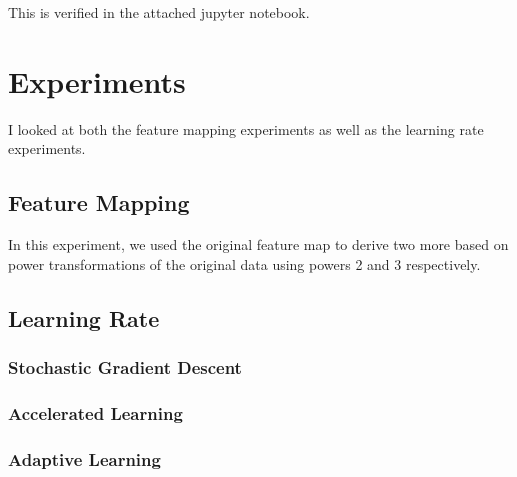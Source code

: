 \documentclass{article}
\begin{document}
This is verified in the attached jupyter notebook.

\section{Experiments}
I looked at both the feature mapping experiments as well as the learning rate experiments. 
\subsection{Feature Mapping}
In this experiment, we used the original feature map to derive two more based on power transformations of the original data using powers 2 and 3 respectively.
\subsection{Learning Rate}
\subsubsection{Stochastic Gradient Descent}
\subsubsection{Accelerated Learning}
\subsubsection{Adaptive Learning}
\end{document}
